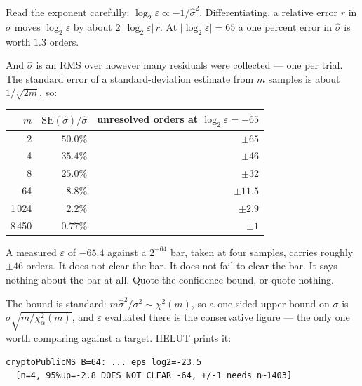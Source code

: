Read the exponent carefully: $\log_2\varepsilon \propto -1/\hat\sigma^2$.
Differentiating, a relative error $r$ in $\hat\sigma$ moves $\log_2\varepsilon$ by
about $2\,\lvert\log_2\varepsilon\rvert\, r$. At $\lvert\log_2\varepsilon\rvert=65$
a one percent error in $\hat\sigma$ is worth $1.3$ orders.

And $\hat\sigma$ is an RMS over however many residuals were collected --- one per
trial. The standard error of a standard-deviation estimate from $m$ samples is
about $1/\sqrt{2m}$, so:

\begin{center}
\small
\begin{tabular}{@{}rrr@{}}
\toprule
$m$ & $\mathrm{SE}(\hat\sigma)/\hat\sigma$ & unresolved orders at $\log_2\varepsilon=-65$ \\
\midrule
2 & $50.0\%$ & $\pm 65$ \\
4 & $35.4\%$ & $\pm 46$ \\
8 & $25.0\%$ & $\pm 32$ \\
64 & $8.8\%$ & $\pm 11.5$ \\
1\,024 & $2.2\%$ & $\pm 2.9$ \\
8\,450 & $0.77\%$ & $\pm 1$ \\
\bottomrule
\end{tabular}
\end{center}

\begin{warning}
A measured $\varepsilon$ of $-65.4$ against a $2^{-64}$ bar, taken at four
samples, carries roughly $\pm 46$ orders. It does not clear the bar. It does not
fail to clear the bar. It says nothing about the bar at all. Quote the confidence
bound, or quote nothing.
\end{warning}

The bound is standard: $m\hat\sigma^2/\sigma^2 \sim \chi^2(m)$, so a one-sided
upper bound on $\sigma$ is $\hat\sigma\sqrt{m/\chi^2_{\alpha}(m)}$, and
$\varepsilon$ evaluated there is the conservative figure --- the only one worth
comparing against a target. HELUT prints it:

\begin{verbatim}
cryptoPublicMS B=64: ... eps log2=-23.5
  [n=4, 95%up=-2.8 DOES NOT CLEAR -64, +/-1 needs n~1403]
\end{verbatim}


